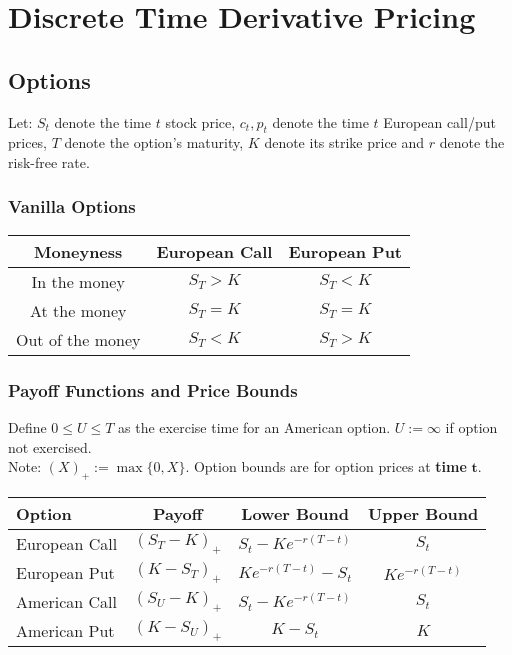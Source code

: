 \documentclass[11pt]{article}
\begin{document}
	\section{Discrete Time Derivative Pricing}
	\subsection{Options}
	Let: \( S_t \) denote the time \( t \) stock price, \( c_t, p_t \) denote the time \( t \) European call/put prices, \( T \) denote the option's maturity, \( K \) denote its strike price and \( r \) denote the risk-free rate.
	\subsubsection{Vanilla Options}
	\begin{center}
		\begin{tabular}{ccc}
			\hline
			\hline
			\textbf{Moneyness} & \textbf{European Call} & \textbf{European Put} \\
			\hline
			In the money & \( S_T > K \) & \( S_T < K \)\\
			\hline
			At the money & \( S_T = K \) & \( S_T = K \)\\
			\hline
			Out of the money &  \( S_T < K \)& \( S_T > K \)\\
			\hline
			\end{tabular}
		\end{center}
	\subsubsection{Payoff Functions and Price Bounds}
	Define \( 0\leq U\leq T \) as the exercise time for an American option. \( U:=\infty \) if option not exercised. \\Note: \( (X)_{+} := \max\{0, X\} \). Option bounds are for option prices at \textbf{time} \( \bm{t} \).
	\begin{center}
		\def\arraystretch{1.25}
		\begin{tabular}{lccc}
			\hline
			\hline
			\textbf{Option} & \textbf{Payoff} & \textbf{Lower Bound} & \textbf{Upper Bound} \\
			\hline
			European Call & \( (S_T - K)_{+} \) & \( S_t - Ke^{-r(T - t)} \) & \( S_t \)\\
			\hline
			European Put & \( (K - S_T)_{+} \) & \( Ke^{-r(T - t)} - S_t \) & \( Ke^{-r(T - t)} \) \\
			\hline
			American Call & \( (S_U - K)_{+} \) & \( S_t - Ke^{-r(T - t)} \) & \( S_t \)\\
			\hline
			American Put & \( (K - S_U)_{+} \) & \( K - S_t \) & \( K \)\\
			\hline
			\end{tabular}
		\end{center}
\end{document}
